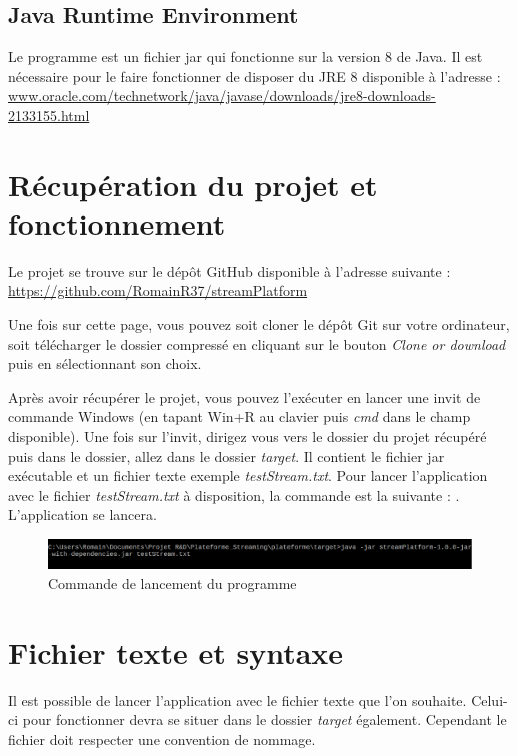 \documentclass{polytech/polytech}
\begin{document}
\subsection{Java Runtime Environment}

Le programme est un fichier jar qui fonctionne sur la version 8 de Java. Il est nécessaire pour le faire fonctionner de disposer du JRE 8 disponible à l'adresse : \url{www.oracle.com/technetwork/java/javase/downloads/jre8-downloads-2133155.html}


\section{Récupération du projet et fonctionnement}

Le projet se trouve sur le dépôt GitHub disponible à l'adresse suivante : \url{https://github.com/RomainR37/streamPlatform}

Une fois sur cette page, vous pouvez soit cloner le dépôt Git sur votre ordinateur, soit télécharger le dossier compressé en cliquant sur le bouton \textit{Clone or download} puis en sélectionnant son choix.

Après avoir récupérer le projet, vous pouvez l'exécuter en lancer une invit de commande Windows (en tapant Win+R au clavier puis \textit{cmd} dans le champ disponible). Une fois sur l'invit, dirigez vous vers le dossier du projet récupéré puis dans le dossier, allez dans le dossier \textit{target}. Il contient le fichier jar exécutable et un fichier texte exemple \textit{testStream.txt}. Pour lancer l'application avec le fichier \textit{testStream.txt} à disposition, la commande est la suivante : . L'application se lancera.

\begin{figure}
	\includegraphics[scale=0.6]{images/cmdLancement.png}
	\caption{Commande de lancement du programme}
\end{figure}


\section{Fichier texte et syntaxe}

Il est possible de lancer l'application avec le fichier texte que l'on souhaite. Celui-ci pour fonctionner devra se situer dans le dossier \textit{target} également. Cependant le fichier doit respecter une convention de nommage. 
\end{document}
